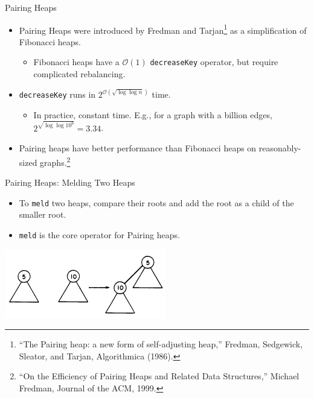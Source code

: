 \documentclass{beamer}
\begin{document}
\begin{frame}{Pairing Heaps}
  \begin{itemize}
    \item Pairing Heaps were introduced by Fredman and Tarjan\footnote{``The Pairing heap: a new form of self-adjusting heap,'' Fredman, Sedgewick, Sleator, and Tarjan, Algorithmica (1986).} as a simplification of Fibonacci heaps.
     \begin{itemize}
        \item Fibonacci heaps have a $\mathcal{O}(1)$ \texttt{decreaseKey} operator, but require complicated rebalancing.
      \end{itemize}
    \item \texttt{decreaseKey} runs in $2^{\mathcal{O}(\sqrt{\log \log n})}$ time.
        \begin{itemize}
          \item In practice, constant time. E.g., for a graph with a billion edges, $2^{\sqrt{\log \log 10^9}} = 3.34$.
        \end{itemize}
      \item Pairing heaps have better performance than Fibonacci heaps on reasonably-sized graphs.\footnote{``On the Efficiency of Pairing Heaps and Related Data Structures,'' Michael Fredman, Journal of the ACM, 1999.}
  \end{itemize}
\end{frame}

\begin{frame}{Pairing Heaps: Melding Two Heaps}
  \begin{itemize}
    \item To \texttt{meld} two heaps, compare their roots and add the root
      as a child of the smaller root.
    \item \texttt{meld} is the core operator for Pairing heaps.
  \end{itemize}
  \includegraphics[scale=1.0]{img/meld.png}
\end{frame}
\end{document}
